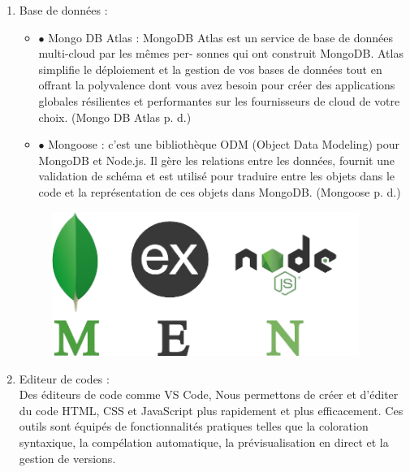 \documentclass[a4paper,12pt,oneside]{article}
\begin{document}
{{\begin{enumerate}
\begin{itemize}
    		\end{itemize} 
    		\newpage
    	\item Base de données : 
 		\begin{itemize}
        \item[] $\bullet$ Mongo DB Atlas : MongoDB Atlas est un service de base de données multi-cloud par les mêmes per-
sonnes qui ont construit MongoDB. Atlas simplifie le déploiement et la gestion de
vos bases de données tout en offrant la polyvalence dont vous avez besoin pour créer
des applications globales résilientes et performantes sur les fournisseurs de cloud de
votre choix. (Mongo DB Atlas p. d.)
    		\item[] $\bullet$ Mongoose : c’est une bibliothèque ODM (Object Data Modeling) pour MongoDB et Node.js. Il
gère les relations entre les données, fournit une validation de schéma et est utilisé
pour traduire entre les objets dans le code et la représentation de ces objets dans
MongoDB. (Mongoose p. d.)     
    		\end{itemize} 
    		\begin{figure}[h]
		\centering
		\includegraphics[width=10cm]{MERN-logo}
		\end{figure}
		
		
    	\item Editeur de codes : \\
 		Des éditeurs de code comme VS Code, Nous permettons de créer et d’éditer du
code HTML, CSS et JavaScript plus rapidement et plus efficacement. Ces outils sont
équipés de fonctionnalités pratiques telles que la coloration syntaxique, la compélation automatique, la prévisualisation en direct et la gestion de versions.
	
		
		

\end{enumerate}}}
\end{document}

